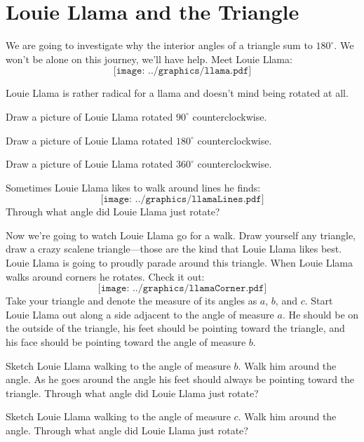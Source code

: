 \newpage
\section{Louie Llama and the Triangle} 

We are going to investigate why the interior angles of a triangle sum
to $180^\circ$. We won't be alone on this journey, we'll have help.
Meet Louie Llama:
\[
\texttt{[image: ../graphics/llama.pdf]}
\]

Louie Llama is rather radical for a llama and doesn't mind being
rotated at all.

\begin{prob} 
Draw a picture of Louie Llama rotated $90^\circ$ counterclockwise.
\end{prob}

\begin{prob} 
Draw a picture of Louie Llama rotated $180^\circ$ counterclockwise.
\end{prob}

\begin{prob} 
Draw a picture of Louie Llama rotated $360^\circ$ counterclockwise.
\end{prob}

\begin{prob} Sometimes Louie Llama likes to walk around lines he finds:
\[
\texttt{[image: ../graphics/llamaLines.pdf]}
\]
Through what angle did Louie Llama just rotate?
\end{prob}


Now we're going to watch Louie Llama go for a walk. Draw yourself any
triangle, draw a crazy scalene triangle---those are the kind that Louie
Llama likes best. Louie Llama is going to proudly parade around this
triangle. When Louie Llama walks around corners he rotates. Check
it out:
\[
\texttt{[image: ../graphics/llamaCorner.pdf]}
\]
Take your triangle and denote the measure of its angles as $a$, $b$,
and $c$. Start Louie Llama out along a side adjacent to the angle of
measure $a$. He should be on the outside of the triangle, his feet
should be pointing toward the triangle, and his face should be
pointing toward the angle of measure $b$.
\begin{prob} 
Sketch Louie Llama walking to the angle of measure $b$. Walk him
around the angle. As he goes around the angle his feet should always
be pointing toward the triangle. Through what angle did Louie Llama
just rotate?
\end{prob}

\begin{prob}
Sketch Louie Llama walking to the angle of measure $c$. Walk him
around the angle. Through what angle did Louie Llama just rotate?
\end{prob}

